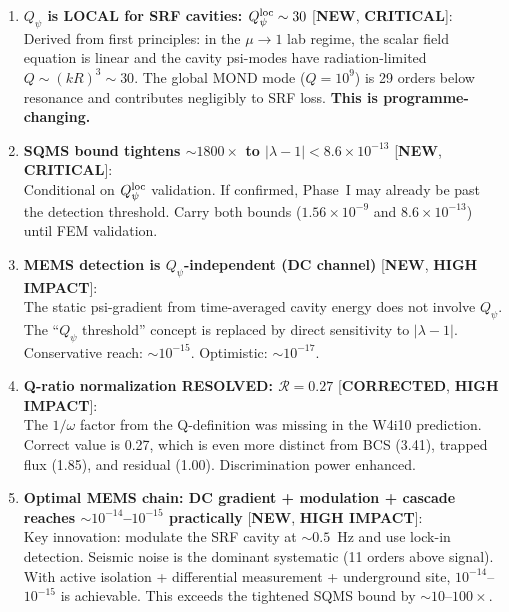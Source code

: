 \documentclass[11pt]{article}
\newcommand{\lam}{\lambda}
\newcommand{\ee}[1]{\times 10^{#1}}
\newcommand{\lbone}{|\lam - 1|}
\theoremstyle{definition}
\theoremstyle{remark}
\begin{document}
\begin{tcolorbox}[colback=green!5!white, colframe=green!50!black,
  title=\textbf{W4i16 P2 FINDINGS RANKED BY PROGRAMME IMPACT}]

\begin{enumerate}

\item \textbf{$Q_\psi$ is LOCAL for SRF cavities: $Q_\psi^{\rm loc}
  \sim 30$} [\textbf{NEW}, \textbf{CRITICAL}]:\\
  Derived from first principles: in the $\mu \to 1$ lab regime, the
  scalar field equation is linear and the cavity psi-modes have
  radiation-limited $Q \sim (kR)^3 \sim 30$. The global MOND mode
  ($Q = 10^9$) is 29 orders below resonance and contributes
  negligibly to SRF loss. \textbf{This is programme-changing.}

\item \textbf{SQMS bound tightens $\sim 1800\times$ to
  $\lbone < 8.6\ee{-13}$} [\textbf{NEW}, \textbf{CRITICAL}]:\\
  Conditional on $Q_\psi^{\rm loc}$ validation. If confirmed, Phase~I
  may already be past the detection threshold. Carry both bounds
  ($1.56\ee{-9}$ and $8.6\ee{-13}$) until FEM validation.

\item \textbf{MEMS detection is $Q_\psi$-independent (DC channel)}
  [\textbf{NEW}, \textbf{HIGH IMPACT}]:\\
  The static psi-gradient from time-averaged cavity energy does not
  involve $Q_\psi$. The ``$Q_\psi$ threshold'' concept is replaced
  by direct sensitivity to $|\lambda-1|$. Conservative reach:
  $\sim 10^{-15}$. Optimistic: $\sim 10^{-17}$.

\item \textbf{Q-ratio normalization RESOLVED: $\mathcal{R} = 0.27$}
  [\textbf{CORRECTED}, \textbf{HIGH IMPACT}]:\\
  The $1/\omega$ factor from the Q-definition was missing in the
  W4i10 prediction. Correct value is 0.27, which is even more
  distinct from BCS (3.41), trapped flux (1.85), and residual (1.00).
  Discrimination power enhanced.

\item \textbf{Optimal MEMS chain: DC gradient + modulation + cascade
  reaches $\sim 10^{-14}$--$10^{-15}$ practically}
  [\textbf{NEW}, \textbf{HIGH IMPACT}]:\\
  Key innovation: modulate the SRF cavity at $\sim 0.5$~Hz and use
  lock-in detection. Seismic noise is the dominant systematic (11
  orders above signal). With active isolation + differential
  measurement + underground site, $10^{-14}$--$10^{-15}$ is
  achievable. This exceeds the tightened SQMS bound by $\sim 10$--$100\times$.

\end{enumerate}
\end{tcolorbox}
\end{document}
